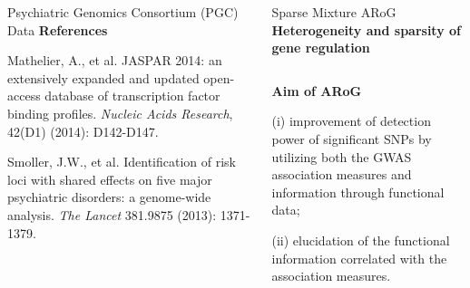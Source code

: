 \documentclass[final]{beamer}
\begin{document}
\begin{frame}{}
\begin{columns}[t]
\begin{column}{1\linewidth}
\begin{columns}
\begin{column}{.38\textwidth}
\begin{block}{Psychiatric Genomics Consortium (PGC) Data}
{\textbf{References}}
\centering
\bi
{\footnotesize
\item Mathelier, A., et al. JASPAR 2014: an extensively expanded and updated open-access database of transcription factor binding profiles. \textit{Nucleic Acids Research}, 42(D1) (2014): D142-D147.
\item Smoller, J.W., et al. Identification of risk loci with shared effects on five major psychiatric disorders: a genome-wide analysis. \textit{The Lancet} 381.9875 (2013): 1371-1379.}
\ei



\end{block}
 \end{column}

            \begin{column}{.26\textwidth}
        \begin{block}{Sparse Mixture ARoG}
                                  {\color{orange!100} \textbf{Heterogeneity and sparsity of gene regulation}}
			\centering
\begin{center}
      \begin{columns}
            \begin{column}{.47\textwidth}
  \end{column}
            \begin{column}{.41\textwidth}
    \end{column}
\end{columns}
\end{center}

{\color{orange!100} \textbf{Aim of ARoG}}
\begin{center}

\bi
\item[(i)] improvement of detection power of significant SNPs by utilizing both the GWAS association measures and information through functional data;
\item[(ii)] elucidation of the functional information correlated with the association measures.
\ei
\end{center}


\end{block}
\end{column}
\end{columns}
\end{column}
\end{columns}
\end{frame}
\end{document}
